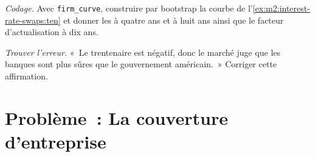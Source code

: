 \begin{exercise}[$\star\star\star$]\label{exo:m2:interest-rate-swaps:7}
\emph{Codage.} Avec \texttt{firm\_curve}, construire par bootstrap la courbe de
l'\cref{ex:m2:interest-rate-swaps:ten} et donner les  à quatre ans et à huit ans
ainsi que le facteur d'actualisation à dix ans.
\end{exercise}

\begin{exercise}[$\star\star\star$]\label{exo:m2:interest-rate-swaps:8}
\emph{Trouver l'erreur.} «~Le  trentenaire est négatif, donc le marché juge que les
banques sont plus sûres que le gouvernement américain.~» Corriger cette affirmation.
\end{exercise}

\section{Problème~: La couverture d'entreprise}

